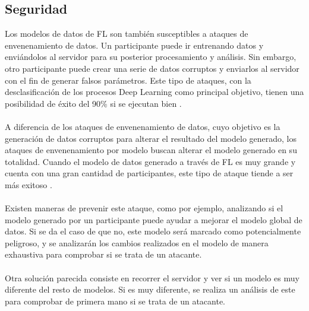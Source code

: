 \subsection{Seguridad}
Los modelos de datos de FL son también susceptibles a ataques de envenenamiento de datos. Un participante puede ir entrenando datos y enviándolos al servidor para su posterior procesamiento y análisis. Sin embargo, otro participante puede crear una serie de datos corruptos y enviarlos al servidor con el fin de generar falsos parámetros. Este tipo de ataques, con la desclasificación de los procesos Deep Learning como principal objetivo, tienen una posibilidad de éxito del 90\% si se ejecutan bien \autocite{armknechtGuideFullyHomomorphic2015}.
\\ \\
A diferencia de los ataques de envenenamiento de datos, cuyo objetivo es la generación de datos corruptos para alterar el resultado del modelo generado, los ataques de envenenamiento por modelo buscan alterar el modelo generado en su totalidad. Cuando el modelo de datos generado a través de FL es muy grande y cuenta con una gran cantidad de participantes, este tipo de ataque tiende a ser más exitoso \autocite{bhagoji2019analyzing}.
\\ \\
Existen maneras de prevenir este ataque, como por ejemplo, analizando si el modelo generado por un participante puede ayudar a mejorar el modelo global de datos. Si se da el caso de que no, este modelo será marcado como potencialmente peligroso, y se analizarán los cambios realizados en el modelo de manera exhaustiva para comprobar si se trata de un atacante. 
\\ \\ 
Otra solución parecida consiste en recorrer el servidor y ver si un modelo es muy diferente del resto de modelos. Si es muy diferente, se realiza un análisis de este para comprobar de primera mano si se trata de un atacante.